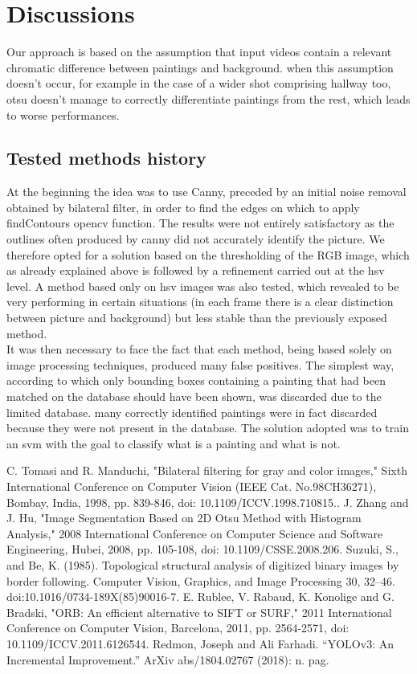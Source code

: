 \documentclass[conference]{IEEEtran}
\begin{document}
\bigskip
\bigskip
\bigskip


\section{Discussions}
Our approach is based on the assumption that input videos contain a relevant chromatic difference between paintings and background. when this assumption doesn’t occur, for example in the case of a wider shot comprising hallway too, otsu doesn’t manage to correctly differentiate paintings from the rest, which leads to worse performances.
\subsection*{Tested methods history}
At the beginning the idea was to use Canny, preceded by an initial noise removal obtained by bilateral filter, in order to find the edges on which to apply findContours opencv function. The results were not entirely satisfactory as the outlines often produced by canny did not accurately identify the picture. We therefore opted for a solution based on the thresholding of the RGB image, which as already explained above is followed by a refinement carried out at the hsv level. A method based only on hsv images was also tested, which revealed to be very performing in certain situations (in each frame there is a clear distinction between picture and background) but less stable than the previously exposed method.\\
It was then necessary to face the fact that each method, being based solely on image processing techniques, produced many false positives. The simplest way, according to which only bounding boxes containing a painting that had been matched on the database should have been shown, was discarded due to the limited database. many correctly identified paintings were in fact discarded because they were not present in the database. The solution adopted was to train an svm with the goal to classify what is a painting and what is not.


\begin{thebibliography}{00}
 C. Tomasi and R. Manduchi, "Bilateral filtering for gray and color images," Sixth International Conference on Computer Vision (IEEE Cat. No.98CH36271), Bombay, India, 1998, pp. 839-846, doi: 10.1109/ICCV.1998.710815..
 J. Zhang and J. Hu, "Image Segmentation Based on 2D Otsu Method with Histogram Analysis," 2008 International Conference on Computer Science and Software Engineering, Hubei, 2008, pp. 105-108, doi: 10.1109/CSSE.2008.206.
Suzuki, S., and Be, K. (1985). Topological structural analysis of digitized binary images by border following. Computer Vision, Graphics, and Image Processing 30, 32–46. doi:10.1016/0734-189X(85)90016-7.
 E. Rublee, V. Rabaud, K. Konolige and G. Bradski, "ORB: An efficient alternative to SIFT or SURF," 2011 International Conference on Computer Vision, Barcelona, 2011, pp. 2564-2571, doi: 10.1109/ICCV.2011.6126544.
Redmon, Joseph and Ali Farhadi. “YOLOv3: An Incremental Improvement.” ArXiv abs/1804.02767 (2018): n. pag.
\end{thebibliography}
\end{document}
